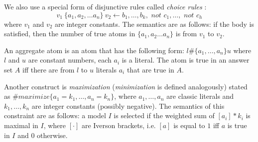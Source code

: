 We also use a special form of disjunctive rules called \textit{choice rules} \cite{aspbook}:
\begin{equation*}
  v_1~\{ a_1, a_2, \dots a_n \}~v_2 \leftarrow b_1, \dots, b_k, \textit{ not }c_1,\dots,\textit{ not }c_h
\end{equation*}
where $v_1$ and $v_2$ are integer constants. The semantics are as follows: if the body is satisfied, then the number of true atoms in $\{ a_1, a_2 \dots a_n \}$ is from $v_1$ to $v_2$.

An aggregate atom is an atom that has the following form: $l \# \{ a_1, \dots ,a_n \} u$
where $l$ and $u$ are constant numbers, each $a_i$ is a literal. The atom is true in an answer set $A$ iff there are from $l$ to $u$ literals $a_i$ that are true in $A$.

Another construct is \textit{maximization} \citep{aspbook, leone} (\textit{minimization} is defined analogously) stated as $\#maximize\{ a_1=k_1, \dots, a_n=k_n \}$, 
where $a_1, \dots, a_n$ are classic literals and $k_1, \dots, k_n$ are integer constants (possibly negative). The semantics of this constraint are as follows: a model $I$ is selected if the weighted sum of $[a_i]*k_i$ is maximal in $I$, where $[\cdot]$ are Iverson brackets, i.e. $[a]$ is equal to $1$ iff $a$ is true in $I$ and $0$ otherwise.










